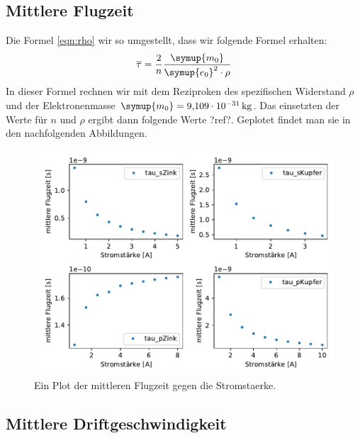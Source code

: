     \subsection{Mittlere Flugzeit}

    
    Die Formel \ref{eqn:rho} wir so umgestellt, dass wir folgende Formel erhalten:
    \begin{equation}
        \overline{\tau} =\frac{2}{n}\frac{\symup{m_0}}{\symup{e_0}^2 \cdot \rho}
    \end{equation}
    In dieser Formel rechnen wir mit dem Reziproken des spezifischen Widerstand $\rho$ und der Elektronenmasse
    $\symup{m_0} = \SI{9.109e-31}{\kilogram}$. Das einsetzten der Werte für $n$ und $\rho$ ergibt dann folgende Werte ?ref?.
    Geplotet findet man sie in den nachfolgenden Abbildungen.

    \begin{figure}[H]
        \centering
        \includegraphics[width=1.1\textwidth]{build/tau.pdf}
        \caption{Ein Plot der mittleren Flugzeit gegen die Stromstaerke.}
        \label{img:tau}
    \end{figure}


    \subsection{Mittlere Driftgeschwindigkeit}


